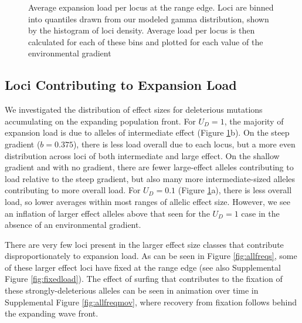 \begin{figure}[!ht]
\centering
{}
\caption[~- Average expansion load per locus.]{Average expansion load per locus at the range edge. Loci are binned into quantiles drawn from our modeled gamma distribution, shown by the histogram of loci density. Average load per locus is then calculated for each of these bins and plotted for each value of the environmental gradient}
\label{fig:loci}
\end{figure}

\subsection{Loci Contributing to Expansion Load}
We investigated the distribution of effect sizes for deleterious mutations accumulating on the expanding population front. For $U_D = 1$, the majority of expansion load is due to alleles of intermediate effect (Figure \ref{fig:loci}b). On the steep gradient ($b = 0.375$), there is less load overall due to each locus, but a more even distribution across loci of both intermediate and large effect. On the shallow gradient and with no gradient, there are fewer large-effect alleles contributing to load relative to the steep gradient, but also many more intermediate-sized alleles contributing to more overall load. For $U_D = 0.1$ (Figure \ref{fig:loci}a), there is less overall load, so lower averages within most ranges of allelic effect size. However, we see an inflation of larger effect alleles above that seen for the $U_D= 1$ case in the absence of an environmental gradient.



There are very few loci present in the larger effect size classes that contribute disproportionately to expansion load. As can be seen in Figure \ref{fig:allfreqs}, some of these larger effect loci have fixed at the range edge (see also Supplemental Figure \ref{fig:fixedload}). The effect of surfing that contributes to the fixation of these strongly-deleterious alleles can be seen in animation over time in Supplemental Figure \ref{fig:allfreqmov}, where recovery from fixation follows behind the expanding wave front.


